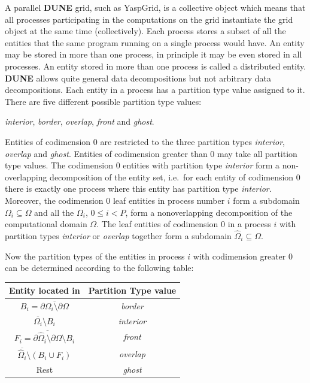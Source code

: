 \documentclass[11pt,a4paper,headinclude,footinclude,DIV16,normalheadings]{scrreprt}
\newcommand{\Dune}{{\sf\bfseries DUNE}\xspace}
\begin{document}
A parallel \Dune{} grid, such as YaspGrid, is a collective object which
means that all processes participating in the computations on the grid
instantiate the grid object at the same time (collectively). Each
process stores a subset of all the entities that the same program running on a
single process would have. An entity may be stored in more
than one process, in principle it may be even stored in all
processes. An entity
stored in more than one process is called a distributed entity. \Dune{}
allows quite general data decompositions but not arbitrary data
decompositions. Each entity in a process has a partition type
value assigned to it. There are five different possible partition type
values:
\begin{center}
\textit{interior}, \textit{border}, \textit{overlap},
  \textit{front} and \textit{ghost}.
\end{center}

Entities of codimension 0 are restricted to the three partition types
\textit{interior}, \textit{overlap} and \textit{ghost}. Entities of
codimension greater than 0 may take all partition type values. 
The codimension 0 entities with partition type \textit{interior} form a
non-overlapping decomposition of the entity set, i.e.~for each
entity of codimension 0 there is exactly one process where this entity
has partition type \textit{interior}.
Moreover, the codimension 0 leaf entities in process number $i$ form a
subdomain $\Omega_i\subseteq\Omega$ and all the $\Omega_i$, $0\leq i <
P$, form a nonoverlapping decomposition of the computational domain
$\Omega$. The leaf entities of codimension 0 in a process $i$ with
partition types \textit{interior} or \textit{overlap} together form a
subdomain $\hat{\Omega}_i\subseteq\Omega$.

Now the partition types of the entities in process $i$ 
with codimension greater 0 can
be determined according to the following table:
\begin{center}
\begin{tabular}{cc}
\hline
\hline
Entity located in & Partition Type value\\
\hline
$B_i=\overline{\partial\Omega_i\setminus\partial\Omega}$ &
\textit{border}\\
$\overline{\Omega_i}\setminus B_i$ & \textit{interior}\\
$F_i =
\overline{\partial\hat{\Omega}_i\setminus\partial\Omega}\setminus B_i$
& \textit{front}\\
$\overline{\hat{\Omega}_i}\setminus(B_i\cup F_i)$ & \textit{overlap}\\
Rest & \textit{ghost}\\
\hline
\hline
\end{tabular}
\end{center}
\end{document}
